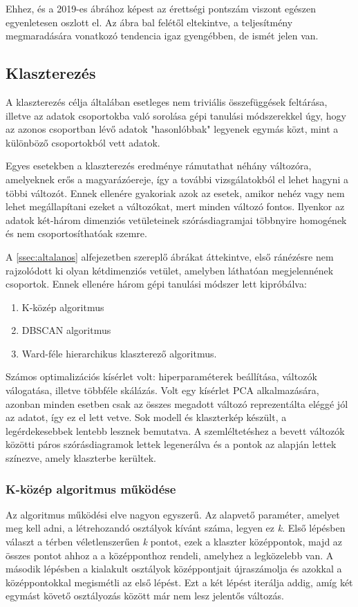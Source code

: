 \documentclass[12pt]{article}
\begin{document}
Ehhez, és a 2019-es ábrához képest az érettségi pontszám viszont egészen egyenletesen oszlott el. Az ábra bal felétől eltekintve, a teljesítmény megmaradására vonatkozó tendencia igaz gyengébben, de ismét jelen van.


\subsection{Klaszterezés}

A klaszterezés célja általában esetleges nem triviális összefüggések feltárása, illetve az adatok csoportokba való sorolása gépi tanulási módszerekkel úgy, hogy az azonos csoportban lévő adatok "hasonlóbbak" legyenek egymás közt, mint a különböző csoportokból vett adatok.

Egyes esetekben a klaszterezés eredménye rámutathat néhány változóra, amelyeknek erős a magyarázóereje, így a további vizsgálatokból el lehet hagyni a többi változót. Ennek ellenére gyakoriak azok az esetek, amikor nehéz vagy nem lehet megállapítani ezeket a változókat, mert minden változó fontos. Ilyenkor az adatok két-három dimenziós vetületeinek szórásdiagramjai többnyire homogének és nem csoportosíthatóak szemre.

A \ref{ssec:altalanos} alfejezetben szereplő ábrákat áttekintve, első ránézésre nem rajzolódott ki olyan kétdimenziós vetület, amelyben láthatóan megjelennének csoportok. Ennek ellenére három gépi tanulási módszer lett kipróbálva:
\begin{enumerate}
\item K-közép algoritmus
\item DBSCAN algoritmus
\item Ward-féle hierarchikus klaszterező algoritmus.
\end{enumerate}

Számos optimalizációs kísérlet volt: hiperparaméterek beállítása, változók válogatása, illetve többféle skálázás. Volt egy kísérlet PCA alkalmazására, azonban minden esetben csak az összes megadott változó reprezentálta eléggé jól az adatot, így ez el lett vetve. Sok modell és klaszterkép készült, a legérdekesebbek lentebb lesznek bemutatva. A szemléltetéshez a bevett változók közötti páros szórásdiagramok lettek legenerálva és a pontok az alapján lettek színezve, amely klaszterbe kerültek.

\subsubsection{K-közép algoritmus működése}
Az algoritmus működési elve nagyon egyszerű. Az alapvető paraméter, amelyet meg kell adni, a létrehozandó osztályok kívánt száma, legyen ez \textit{k}. Első lépésben választ a térben véletlenszerűen \textit{k} pontot, ezek a klaszter középpontok, majd az összes pontot ahhoz a a középponthoz rendeli, amelyhez a legközelebb van. A második lépésben a kialakult osztályok középpontjait újraszámolja és azokkal a középpontokkal megismétli az első lépést. Ezt a két lépést iterálja addig, amíg két egymást követő osztályozás között már nem lesz jelentős változás.
\end{document}
